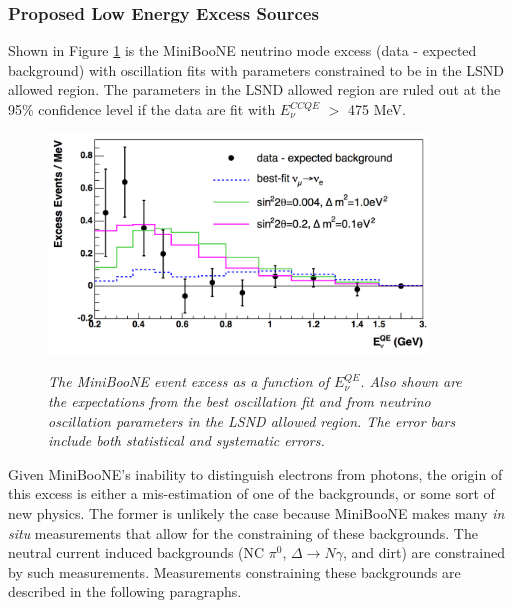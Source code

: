\subsubsection{Proposed Low Energy Excess Sources}
Shown in Figure \ref{MB_published_excess_fits_fig} is the MiniBooNE neutrino mode excess (data - expected background) with oscillation fits with parameters constrained to be in the LSND allowed region. The parameters in the LSND allowed region are ruled out at the 95\% confidence level if the data are fit with $E_\nu^{CCQE}$ $>$ 475 MeV. \\

\begin{figure}[ht!]
\centering
	\includegraphics[width=0.9\textwidth]{Figures/MB_published_excess_fits.png} \\
\caption{\textit{The MiniBooNE event excess as a function of $E_\nu^{QE}$. Also shown are the expectations from the best oscillation fit and from neutrino oscillation parameters in the LSND allowed region. The error bars include both statistical and systematic errors.}}\label{MB_published_excess_fits_fig}
\end{figure}

Given MiniBooNE's inability to distinguish electrons from photons, the origin of this excess is either a mis-estimation of one of the backgrounds, or some sort of new physics. The former is unlikely the case because MiniBooNE makes many \textit{in situ} measurements that allow for the constraining of these backgrounds. The neutral current induced backgrounds (NC $\pi^0$, $\Delta\rightarrow N\gamma$, and dirt) are constrained by such measurements. Measurements constraining these backgrounds are described in the following paragraphs.\\

